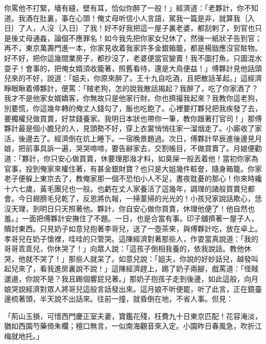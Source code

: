 你罵他不打緊，墻有縫，壁有耳，恰似你醉了一般！」經濟道：「老夥計，你不知道。我酒在肚裏，事在心頭！俺丈母听信小人言語，駕我一篇是非，就算我｛入日｝了人，人沒｛入日｝了我！好不好我把這一屋子裏老婆，都刮剌了，到官也只是後丈母通姦，論個不應罪名！如今我先把你家女兒休了，然後一紙狀子告到官；再不，東京萬壽門進一本，你家見收着我家許多金銀箱籠，都是楊戩應沒官賍物。好不好，把你這幾間業房子，都抄沒了，老婆便當官變賣！我不圖打魚，只圖混水耍子！會事的，把俺女婿須收籠著，照舊看待，還是大鳥便益！」傅夥計見他話頭兒來的不好，說道：「姐夫，你原來醉了。王十九自吃酒，且把散話革起。」這經濟睜眼瞅着傅夥計，便罵：「賊老狗，怎的說我散話揭起？我醉了，吃了你家酒了？我才不是他家女婿嬌客，你無故只是他家行財。你也擠撮我起來？我教你這老狗，別要慌，你這幾年轉的俺丈人錢勾了，飯也吃飽了。心裡要打夥兒把我疾發了去，要獨權兒做買賣，好禁錢養家。我明日本狀也帶你一筆，教你跟著打官司！」那傅夥計最是個小膽兒的人，見頭勢不好，穿上衣裳悄悄往家一溜烟走了。小廝收了家活，後邊去了。經濟倒在炕上睡下。一宿晚景題過。次日，傅夥計早辰進後邊見月娘，把前事具訴一遍，哭哭啼啼，要告辭家去，交割帳目，不做買賣了。月娘便勸道：「夥計，你只安心做買賣，休要理那潑才料，如臭屎一般丟着他！當初你家為官事，投到俺家來權住著，有甚金銀財寶？也只是大姐幾件粧奩，隨身箱籠。你家老子便躲上東京去了，教俺家那一個不恐怕小人不足，晝夜耽憂的那心！你來時纔十六七歲，黃毛團兒也一般。也虧在丈人家養活了這幾年，調理的諸般買賣兒都會。今日翅膀毛兒乾了，反恩將仇報，一掃葦掃的光光的！小孩兒家說話欺心，恁沒天理，到明日只天照著他。夥計，你自安心做你買賣，休理他便了！他自然也羞。」一面把傅夥計安撫住了不題。一日，也是合當有事。印子舖擠著一屋子人，贖討東西。只見奶子如意兒抱著李哥兒，送了一壺茶來，與傅夥計吃，放在卓上。孝哥兒在奶子懷裡，哇哇的只管哭。這陳經濟對著那些人，作耍當真說道：「我的哥哥乖乖兒，你休哭了！」向眾人說：「這孩子倒相我養的，依我說話。教他休哭，他就不哭了！」那些人就呆了。如意兒說：「姐夫，你說的好妙話兒，越發叫起兒來了，看我進房裏說不說！」這陳經濟趕上，踢了奶子兩腳，戲罵道：「怪賊邋遢，你說不是？我且踢個響屁兒著。」那奶子抱孩子走到後邊，如此這般，向月娘哭說經濟對眾人將哥兒這般言話發出來。這月娘不听便罷，听了此言，正在鏡臺邊梳著頭，半天說不出話來。往前一撞，就昏倒在地，不省人事。但見：

「荊山玉損，可惜西門慶正室夫妻，寶鑑花殘，枉費九十日東京匹配！花容淹淡，猶如西園芍藥倚朱欄；檀口無言，一似南海觀音來入定。小園昨日春風急，吹折江梅就地托。」

